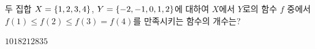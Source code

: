 두 집합 $X=\{1{,}\mkern3mu\mathopen{}2{,}\mkern3mu\mathopen{}3{,}\mkern3mu\mathopen{}4\}$, $Y=\{-2{,}\mkern3mu\mathopen{}-1{,}\mkern3mu\mathopen{}0{,}\mkern3mu\mathopen{}1{,}\mkern3mu\mathopen{}2\}$에 대하여 $X$에서 $Y$로의 함수 $f$ 중에서 $f(1)\le f(2)\le f(3)=f(4)$를 만족시키는 함수의 개수는?
\begin{choices32}{$10$}{$18$}{$21$}{$28$}{$35$}\end{choices32}
